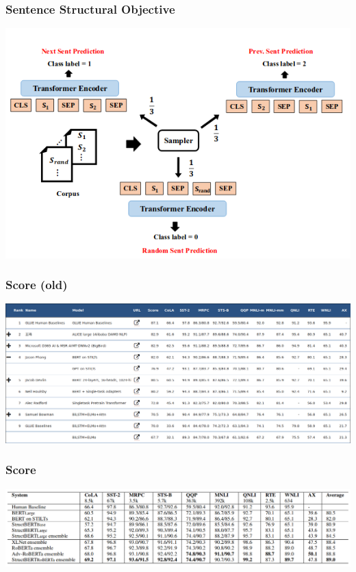 \documentclass{beamer}
\begin{document}
\begin{frame}
    \frametitle{Sentence Structural Objective}
    \begin{center}
        \includegraphics[scale=1.35]{img/StructBERT-sso.png}
    \end{center}
\end{frame}

\begin{frame}
    \frametitle{Score (old)}
    \begin{center}
        \includegraphics[scale=0.9]{img/glue_leaderboard_old.png}
    \end{center}
\end{frame}

\begin{frame}
    \frametitle{Score}
    \begin{center}
        \includegraphics[scale=1.0]{img/StructBERT-score.png}
    \end{center}
\end{frame}
\end{document}

